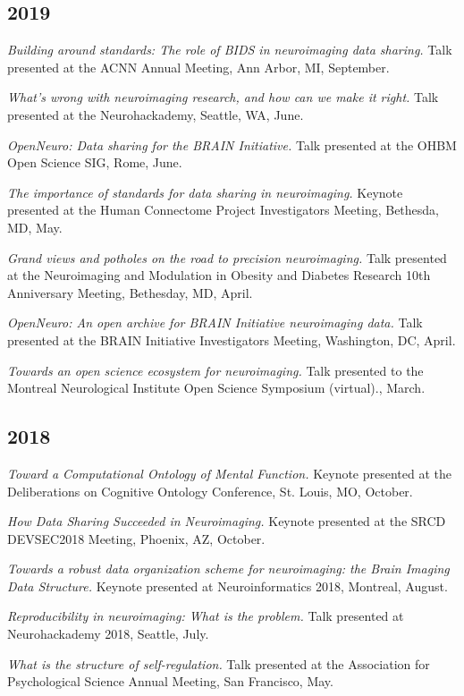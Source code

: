 \documentclass[10pt, letterpaper]{article}
\begin{document}
\subsection*{2019}\textit{Building around standards: The role of BIDS in neuroimaging data sharing.} Talk presented at the ACNN Annual Meeting, Ann Arbor, MI, September.

\textit{What's wrong with neuroimaging research, and how can we make it right.} Talk presented at the Neurohackademy, Seattle, WA, June.

\textit{OpenNeuro: Data sharing for the BRAIN Initiative.} Talk presented at the OHBM Open Science SIG, Rome, June.

\textit{The importance of standards for data sharing in neuroimaging.} Keynote presented at the Human Connectome Project Investigators Meeting, Bethesda, MD, May.

\textit{Grand views and potholes on the road to precision neuroimaging.} Talk presented at the Neuroimaging and Modulation in Obesity and Diabetes Research 10th Anniversary Meeting, Bethesday, MD, April.

\textit{OpenNeuro: An open archive for BRAIN Initiative neuroimaging data.} Talk presented at the BRAIN Initiative Investigators Meeting, Washington, DC, April.

\textit{Towards an open science ecosystem for neuroimaging.} Talk presented to the Montreal Neurological Institute Open Science Symposium (virtual)., March.

\subsection*{2018}\textit{Toward a Computational Ontology of Mental Function.} Keynote presented at the Deliberations on Cognitive Ontology Conference, St. Louis, MO, October.

\textit{How Data Sharing Succeeded in Neuroimaging.} Keynote presented at the SRCD DEVSEC2018 Meeting, Phoenix, AZ, October.

\textit{Towards a robust data organization scheme for neuroimaging: the Brain Imaging Data Structure.} Keynote presented at Neuroinformatics 2018, Montreal, August.

\textit{Reproducibility in neuroimaging: What is the problem.} Talk presented at Neurohackademy 2018, Seattle, July.

\textit{What is the structure of self-regulation.} Talk presented at the Association for Psychological Science Annual Meeting, San Francisco, May.
\end{document}
